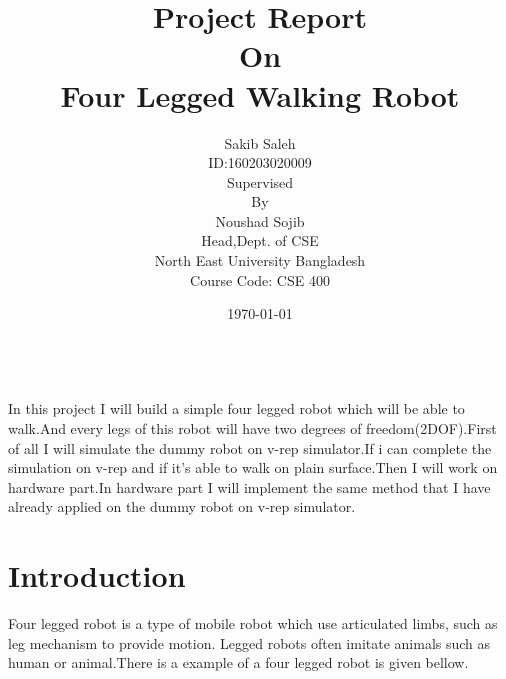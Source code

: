 \documentclass [a4paper ] {report}
\begin{document}
\title{Project Report\\On\\Four Legged Walking Robot }
\author{Sakib Saleh\\ID:160203020009\\ 
Supervised\\By\\Noushad Sojib\\
Head,Dept. of CSE\\North East University Bangladesh\\
Course Code: CSE 400}
\date{\today}
\maketitle
\tableofcontents
\newpage
\listoffigures
\newpage
\begin{center}

\abstractname{\\

In this project I will build a simple four legged robot which will be able to walk.And every legs of this robot will have two degrees of freedom(2DOF).First of all I will simulate the dummy robot on v-rep simulator.If i can complete the simulation on v-rep and if it's able to walk on plain surface.Then I will work on hardware part.In hardware part I will implement the same method that I have already applied on the dummy robot on v-rep simulator. 


}



\end{center}

\newpage
\section{Introduction}
Four legged robot is a type of mobile robot which use articulated limbs, such as leg mechanism to provide motion.
Legged robots often imitate animals such as human or animal.There is a example of a four legged robot is given bellow.
\end{document}
